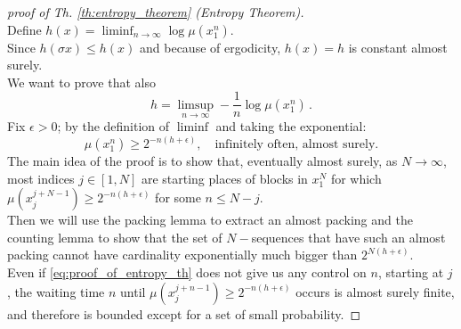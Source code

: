 \begin{proof} [proof of Th. \ref{th:entropy_theorem} (Entropy Theorem)]
\hfill \\
    Define $h(x) = \liminf_{n \rightarrow \infty} \log \mu(x_1^n)$.
    \\Since $h(\sigma x) \leq h(x)$ and because of ergodicity, $h(x) = h$ is constant almost surely. 
    \\We want to prove that also 
    \begin{equation*}
        h = \limsup_{n \rightarrow \infty} -\frac{1}{n} \log \mu(x_1^n) \, .
    \end{equation*}
    Fix $\epsilon > 0$; by the definition of $\liminf$ and taking the exponential:
    \begin{equation}
    \label{eq:proof_of_entropy_th}
        \mu(x_1^n) \geq 2^{-n (h+\epsilon)}, \quad \text{infinitely often, almost surely}.
    \end{equation}
    The main idea of the proof is to show that, eventually almost surely, as $N \rightarrow \infty$, most indices $j \in [1, N]$ are starting places of blocks in $x_1^N$ for which $\mu(x_j^{j+N-1}) \geq 2^{-n(h+\epsilon)}$ for some $n \leq N-j$.
    \\Then we will use the packing lemma to extract an almost packing and the counting lemma to show that the set of $N-$sequences that have such an almost packing cannot have cardinality exponentially much bigger than $2^{N(h+\epsilon)}$.
    \\Even if \ref{eq:proof_of_entropy_th} does not give us any control on $n$, starting at $j$, the waiting time $n$ until $\mu(x_j^{j+n-1}) \geq 2^{-n(h+\epsilon)}$ occurs is  almost surely finite, and therefore is bounded except for a set of small probability.
    

\end{proof}
